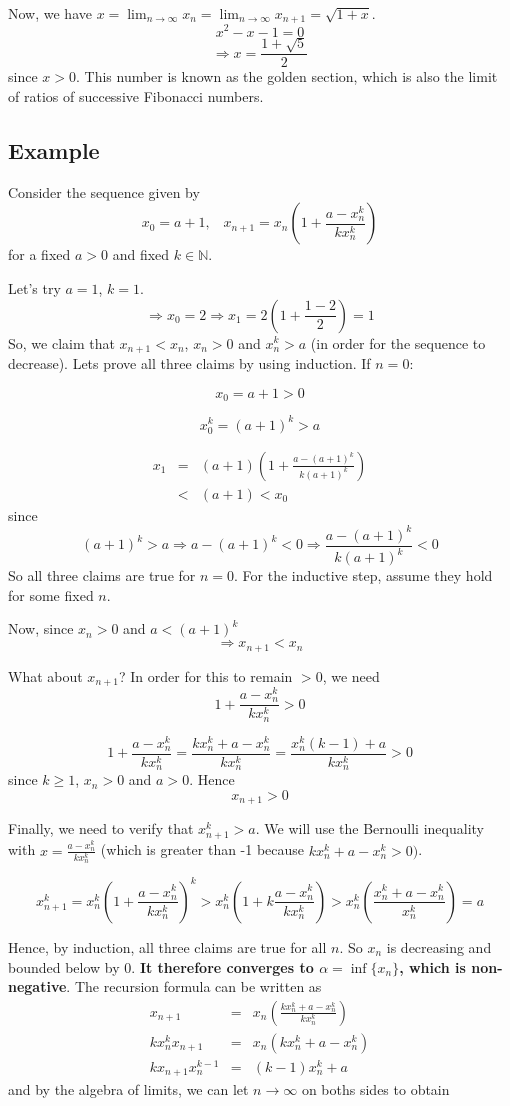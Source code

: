 \documentclass[12pt]{scrbook}
\begin{document}
Now, we have $x = \lim_{n \to \infty} x_n = \lim_{n \to \infty} x_{n+1} = \sqrt{1 + x}$. 
\[ x^2 - x - 1 = 0 \]
\[ \Rightarrow x = \frac{1 + \sqrt{5}}{2} \]
since $x > 0$.  This number is known as the golden section, which is also the limit of ratios of successive Fibonacci numbers.

\subsection{Example}
Consider the sequence given by 
\[ x_0 = a + 1, \;\;\; x_{n+1} = x_n \left( 1 + \frac{a - x_n^k}{k x_n^k} \right) \]
for a fixed $a > 0$ and fixed $k \in \mathbb{N}$. 

Let's try $a = 1$, $k = 1$.  
\[ \Rightarrow x_0 = 2 \Rightarrow x_1 = 2 \left( 1 + \frac{1-2}{2} \right) = 1 \]
So, we claim that $x_{n+1} < x_n$, $x_n > 0$ and $x_n^k > a$ (in order for the sequence to decrease).  Lets prove all three claims
by using induction. If $n = 0$:

\[ x_0 = a + 1 > 0 \]

\[ x_0^k = (a+1)^k > a \]  

\begin{eqnarray*}
 x_1 &=& (a+1) \left( 1 + \frac{a - (a+1)^k}{k(a+1)^k} \right) \\
       &<& (a+1) < x_0
\end{eqnarray*}
since
\[ (a + 1)^k > a \Rightarrow a - (a+1)^k <0 \Rightarrow \frac{a - (a+1)^k}{k(a+1)^k} < 0 \]
So all three claims are true for $n = 0$.  For the inductive step, assume they hold for some fixed $n$.

Now, since $x_n > 0$ and $a < (a+1)^k$ 
\[ \Rightarrow x_{n+1} < x_n \]

What about $x_{n+1}$?  In order for this to remain $> 0$, we need
\[ 1 + \frac{a - x_n^k}{k x_n^k} > 0 \]

\[ 1 + \frac{a - x_n^k}{k x_n^k} = \frac{kx_n^k + a - x_n^k}{kx_n^k} = \frac{x_n^k(k-1) + a}{kx_n^k} > 0\]
since $k \ge 1$, $x_n > 0$ and $a > 0$.  Hence
\[ x_{n+1} > 0 \]

Finally, we need to verify that $x_{n+1}^k > a$.  We will use the Bernoulli inequality with 
$x = \frac{a - x_n^k}{kx_n^k}$ (which is greater than -1 because $kx_n^k + a - x_n^k > 0)$.

\[ x_{n+1}^k = x_n^k \left( 1 + \frac{a - x_n^k}{kx_n^k} \right) ^k > x_n^k \left( 1 + k\frac{a - x_n^k}{kx_n^k} \right) 
> x_n^k \left( \frac{x_n^k + a - x_n^k}{x_n^k} \right)  = a \]

Hence, by induction, all three claims are true for all $n$.  So $x_n$ is decreasing and bounded below by $0$. {\bf It 
therefore converges to $\alpha = \inf \{ x_n \}$, which is non-negative}.  The recursion formula can be written as
\begin{eqnarray*}
x_{n+1}                &=& x_n \left( \frac{kx_n^k + a - x_n^k}{kx_n^k} \right) \\
kx_n^k x_{n+1}    &=& x_n \left( kx_n^k + a - x_n^k \right) \\
kx_{n+1}x_n^{k-1}  &=& (k-1)x_n^k + a 
\end{eqnarray*}
and by the algebra of limits, we can let $n \rightarrow \infty$ on boths sides to obtain
\end{document}
